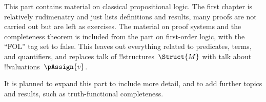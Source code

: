 \documentclass[../../include/open-logic-part]{subfiles}
\begin{document}

\begin{editorial}
  This part contains material on classical propositional logic. The
  first chapter is relatively rudimenatry and just lists definitions
  and results, many proofs are not carried out but are left as
  exercises. The material on proof systems and the completeness
  theorem is included from the part on first-order logic, with the
  ``FOL'' tag set to false. This leaves out everything related to
  predicates, terms, and quantifiers, and replaces talk of
  !!{structure}s~$\Struct{M}$ with talk about
  !!{valuation}s~$\pAssign{v}$.

  It is planned to expand this part to include
  more detail, and to add further topics and results, such as
  truth-functional completeness.
\end{editorial}











\OLEndPartHook
\end{document}
